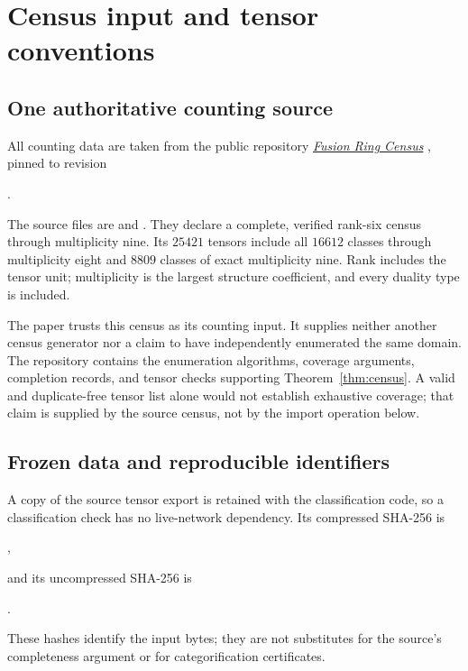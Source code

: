 \section{Census input and tensor conventions}\label{sec:enumeration}
\subsection{One authoritative counting source}
All counting data are taken from the public repository
\href{https://github.com/sebastienpalcoux/fusion-ring-census}{\emph{Fusion Ring Census}}
\cite{CensusRepo}, pinned to revision
\begin{center}.\end{center}
The source files are  and
. They declare a complete, verified
rank-six census through multiplicity nine. Its $25421$ tensors include
all $16612$ classes through multiplicity eight and $8809$ classes of exact
multiplicity nine. Rank includes the tensor unit; multiplicity is the
largest structure coefficient, and every duality type is included.

The paper trusts this census as its counting input. It supplies neither
another census generator nor a claim to have independently enumerated
the same domain. The repository contains the enumeration algorithms,
coverage arguments, completion records, and tensor checks supporting
Theorem~\ref{thm:census}. A valid and duplicate-free tensor list alone
would not establish exhaustive coverage; that claim is supplied by the
source census, not by the import operation below.

\subsection{Frozen data and reproducible identifiers}
A copy of the source tensor export is retained with the classification
code, so a classification check has no live-network dependency. Its
compressed SHA-256 is
\begin{center}\small
{},
\end{center}
and its uncompressed SHA-256 is
\begin{center}\small
{}.
\end{center}
These hashes identify the input bytes; they are not substitutes for the
source's completeness argument or for categorification certificates.

